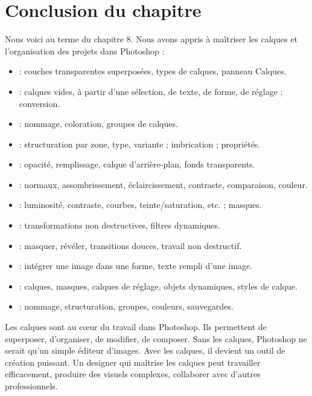 \section*{Conclusion du chapitre}

Nous voici au terme du chapitre 8. Nous avons appris à maîtriser les calques et l'organisation des projets dans Photoshop :

\begin{itemize}
    \item {} : couches transparentes superposées, types de calques, panneau Calques.
    \item {} : calques vides, à partir d'une sélection, de texte, de forme, de réglage ; conversion.
    \item {} : nommage, coloration, groupes de calques.
    \item {} : structuration par zone, type, variante ; imbrication ; propriétés.
    \item {} : opacité, remplissage, calque d'arrière-plan, fonds transparents.
    \item {} : normaux, assombrissement, éclaircissement, contraste, comparaison, couleur.
    \item {} : luminosité, contraste, courbes, teinte/saturation, etc. ; masques.
    \item {} : transformations non destructives, filtres dynamiques.
    \item {} : masquer, révéler, transitions douces, travail non destructif.
    \item {} : intégrer une image dans une forme, texte rempli d'une image.
    \item {} : calques, masques, calques de réglage, objets dynamiques, styles de calque.
    \item {} : nommage, structuration, groupes, couleurs, sauvegardes.
\end{itemize}

Les calques sont au cœur du travail dans Photoshop. Ils permettent de superposer, d'organiser, de modifier, de composer. Sans les calques, Photoshop ne serait qu'un simple éditeur d'images. Avec les calques, il devient un outil de création puissant. Un designer qui maîtrise les calques peut travailler efficacement, produire des visuels complexes, collaborer avec d'autres professionnels.

